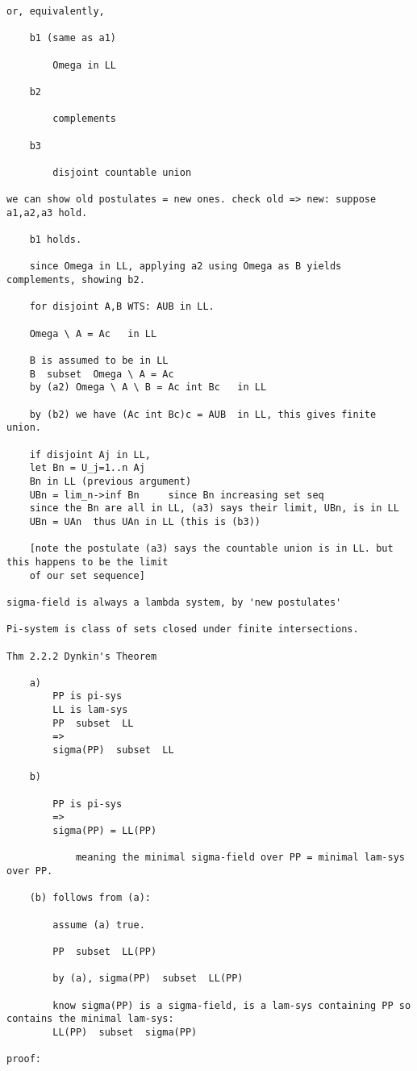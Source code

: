 \documentclass{article}
\begin{document}
\begin{flushleft}
\begin{verbatim}
or, equivalently, 

	b1 (same as a1)
	
		Omega in LL
	
	b2
	
		complements
	
	b3
		
		disjoint countable union
		
we can show old postulates = new ones. check old => new: suppose a1,a2,a3 hold. 

	b1 holds.

	since Omega in LL, applying a2 using Omega as B yields complements, showing b2.
	
	for disjoint A,B WTS: AUB in LL.
	
	Omega \ A = Ac   in LL
	
	B is assumed to be in LL
	B  subset  Omega \ A = Ac 
	by (a2) Omega \ A \ B = Ac int Bc   in LL
	
	by (b2) we have (Ac int Bc)c = AUB  in LL, this gives finite union.
	
	if disjoint Aj in LL,
	let Bn = U_j=1..n Aj
	Bn in LL (previous argument)
	UBn = lim_n->inf Bn     since Bn increasing set seq
	since the Bn are all in LL, (a3) says their limit, UBn, is in LL
	UBn = UAn  thus UAn in LL (this is (b3))
	
	[note the postulate (a3) says the countable union is in LL. but this happens to be the limit 
	of our set sequence]
	
sigma-field is always a lambda system, by 'new postulates'

Pi-system is class of sets closed under finite intersections.

Thm 2.2.2 Dynkin's Theorem

	a) 
		PP is pi-sys
		LL is lam-sys
		PP  subset  LL
		=>
		sigma(PP)  subset  LL
		
	b)
	
		PP is pi-sys
		=>
		sigma(PP) = LL(PP)
		
			meaning the minimal sigma-field over PP = minimal lam-sys over PP.
			
	(b) follows from (a):
	
		assume (a) true. 
		
		PP  subset  LL(PP)
		
		by (a), sigma(PP)  subset  LL(PP)
		
		know sigma(PP) is a sigma-field, is a lam-sys containing PP so contains the minimal lam-sys:
		LL(PP)  subset  sigma(PP)
		
proof:
		

\end{verbatim}
\end{flushleft}
\end{document}
